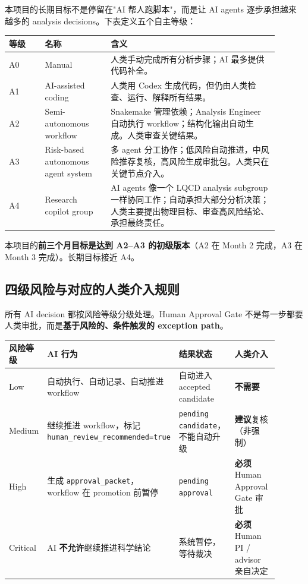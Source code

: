 \documentclass[11pt,a4paper,fontset=fandol]{ctexart}
\begin{document}
本项目的长期目标不是停留在"AI 帮人跑脚本"，而是让 AI agents 逐步承担越来越多的 analysis decisions。下表定义五个自主等级：

\begin{center}
\begin{tabular}{p{0.12\linewidth}p{0.22\linewidth}p{0.56\linewidth}}
\toprule
等级 & 名称 & 含义 \\
\midrule
A0 & Manual & 人类手动完成所有分析步骤；AI 最多提供代码补全。 \\
A1 & AI-assisted coding & 人类用 Codex 生成代码，但仍由人类检查、运行、解释所有结果。 \\
A2 & Semi-autonomous workflow & Snakemake 管理依赖；Analysis Engineer 自动执行 workflow；结构化输出自动生成。人类审查关键结果。 \\
A3 & Risk-based autonomous agent system & 多 agent 分工协作；低风险自动推进，中风险推荐复核，高风险生成审批包。人类只在关键节点介入。 \\
A4 & Research copilot group & AI agents 像一个 LQCD analysis subgroup 一样协同工作；自动承担大部分分析决策；人类主要提出物理目标、审查高风险结论、承担最终责任。 \\
\bottomrule
\end{tabular}
\end{center}

本项目的\textbf{前三个月目标是达到 A2--A3 的初级版本}（A2 在 Month 2 完成，A3 在 Month 3 完成）。长期目标接近 A4。

\subsection{四级风险与对应的人类介入规则}

所有 AI decision 都按风险等级分级处理。Human Approval Gate 不是每一步都要人类审批，而是\textbf{基于风险的、条件触发的 exception path}。

\begin{center}
\begin{tabular}{p{0.12\linewidth}p{0.25\linewidth}p{0.25\linewidth}p{0.28\linewidth}}
\toprule
风险等级 & AI 行为 & 结果状态 & 人类介入 \\
\midrule
Low & 自动执行、自动记录、自动推进 workflow & 自动进入 accepted candidate & \textbf{不需要} \\
Medium & 继续推进 workflow，标记 \texttt{human\_review\_recommended=true} & \texttt{pending candidate}，不能自动升级 & \textbf{建议}复核（非强制） \\
High & 生成 \texttt{approval\_packet}，workflow 在 promotion 前暂停 & \texttt{pending approval} & \textbf{必须} Human Approval Gate 审批 \\
Critical & AI \textbf{不允许}继续推进科学结论 & 系统暂停，等待裁决 & \textbf{必须} Human PI / advisor 亲自决定 \\
\bottomrule
\end{tabular}
\end{center}
\end{document}

